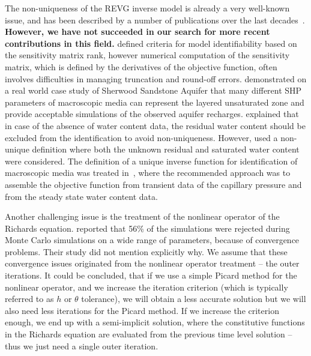 \documentclass[review]{elsarticle}
\begin{document}
The non-uniqueness of the REVG inverse model is already a very well-known issue, and has been described by a number of publications over the last decades~\citep{kool1985, mous1993, ihlwang2003, beven2003-uncertain}. \textbf{However, we have not succeeded in our search for more recent contributions in this field.} \cite{mous1993} defined criteria for model identifiability based on the sensitivity matrix rank, however numerical computation of the sensitivity matrix, which is defined by the derivatives of the objective function, often involves difficulties in managing truncation and round-off errors.
\cite{beven2003-uncertain} demonstrated on a real world case study of Sherwood Sandstone Aquifer that many different SHP parameters of macroscopic media can represent the layered unsaturated zone and provide acceptable simulations of the observed aquifer recharges.  \cite{mous1993} explained that in case of the absence of water content data, the residual water content should be excluded from the identification to avoid non-uniqueness. However, \cite{beven2003-uncertain} used
a non-unique definition where both the unknown residual and saturated water content were considered.
The definition of a unique inverse function for identification of macroscopic media was treated in~\citep{zou200126}, where the recommended approach was to assemble the objective function from transient data of the capillary pressure and from the steady state water content data. %

Another challenging issue is the treatment of the nonlinear operator of the Richards equation. \cite{beven2003-uncertain} reported that 56\% of the simulations were rejected during Monte Carlo simulations on a wide range of parameters, because of convergence problems. 
Their study did not mention explicitly why. We assume that these convergence issues originated from the nonlinear operator treatment -- the outer iterations.
It could be concluded, that if we use a simple Picard method for the nonlinear operator, and we increase the iteration criterion (which is typically referred to as $h$ or $\theta$ tolerance), we will obtain a less accurate solution but we will also need less iterations for the Picard method. If we increase the criterion enough, we end up with a semi-implicit solution, where the constitutive functions in the Richards equation are evaluated from the previous time level solution -- thus we just need a single outer iteration.
\end{document}
